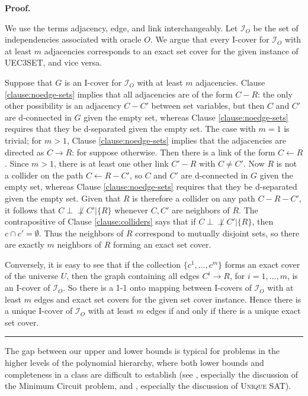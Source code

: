 \documentclass{elsarticle}%
\renewenvironment{proof}[1][Proof]{\noindent\textbf{#1.} }{\ \rule{0.5em}{0.5em}}
\newcommand{\dep}{\ensuremath{{\perp{}\!\!\!\!\!\!\!\not  \perp{}}}}
\newcommand{\R}{R}
\newcommand{\C}{C}
\newcommand{\U}{U}
\newcommand{\G}{G}
\newcommand{\I}{\mathcal{I}}
\renewcommand{\c}{c}
\begin{document}
\begin{proof}
\begin{description}
\end{description}
We use the terms adjacency, edge, and link interchangeably.
Let $\I_O$ be the set of independencies associated with oracle $O$. We argue that every I-cover for $\I_O$ with at least $m$ adjacencies corresponds to an exact set cover for the given instance of  \textsc{UEC3SET}, and vice versa. 

Suppose that $\G$ is an I-cover for $\I_O$ with at least $m$ adjacencies. Clause \ref{clause:noedge-sets} implies that all adjacencies are of the form $\C - \R$: the only other possibility is an adjacency $\C-\C'$ between set variables, but then $\C$ and $\C'$ are d-connected in $\G$ given the empty set, whereas Clause \ref{clause:noedge-sets} requires that they be d-separated given the empty set.
The case with $m=1$ is trivial; for $m > 1$, Clause \ref{clause:noedge-sets} implies that the adjacencies are directed as $\C \rightarrow \R$: for suppose otherwise. Then there is a link of the form $\C \leftarrow \R$. Since $m > 1$, there is at least one other link $\C' - \R$ with $\C \neq \C'$. Now $\R$ is not a collider on the path $\C \leftarrow \R - C'$, so $\C$ and $\C'$ are d-connected in $\G$ given the empty set, whereas Clause \ref{clause:noedge-sets} requires that they be d-separated given the empty set. Given that $\R$ is therefore a collider on any path $\C - \R - \C'$, it follows that $\C \dep \C'| \{R\}$ whenever $\C,\C'$ are neighbors of $\R$. The contrapositive of Clause \ref{clause:colliders} says that if $\C \dep \C'|\{\R\}$, then $\c \cap \c' = \emptyset$. Thus the neighbors of $\R$ correspond to mutually disjoint sets, so there are exactly $m$ neighbors of $\R$ forming an exact set cover. 

Conversely, it is easy to see that if the collection $\{\c^1,\ldots,\c^m\}$ forms an exact cover of the universe $\U$, then the graph containing all edges $\C^i \rightarrow \R$, for $i=1,\ldots,m$, is an I-cover of $\I_O$. So there is a 1-1 onto mapping between I-covers of $\I_O$ with at least $m$ edges and exact set covers for the given set cover instance. Hence there is a unique I-cover of $\I_O$ with at least $m$ edges if and only if there is a unique exact set cover.
\end{proof}

The gap between our upper and lower bounds is typical for problems in the higher levels of the polynomial hierarchy, where both lower bounds and completeness in a class are difficult to establish (see \cite[Ch.17]{papadimitriou94:_comput}, especially the discussion of the Minimum Circuit problem, and \cite[Ch.5]{Rothe2005}, especially the discussion of \textsc{Unique SAT}). 
\end{document}
